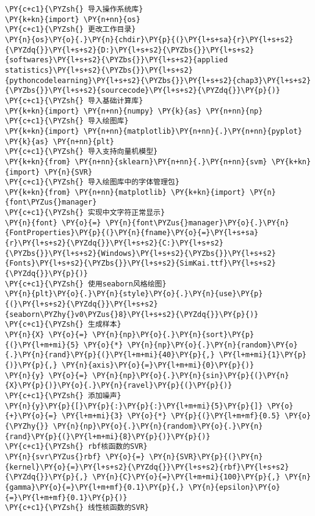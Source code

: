 \begin{Verbatim}[commandchars=\\\{\}]
\PY{c+c1}{\PYZsh{} 导入操作系统库}
\PY{k+kn}{import} \PY{n+nn}{os}
\PY{c+c1}{\PYZsh{} 更改工作目录}
\PY{n}{os}\PY{o}{.}\PY{n}{chdir}\PY{p}{(}\PY{l+s+sa}{r}\PY{l+s+s2}{\PYZdq{}}\PY{l+s+s2}{D:}\PY{l+s+s2}{\PYZbs{}}\PY{l+s+s2}{softwares}\PY{l+s+s2}{\PYZbs{}}\PY{l+s+s2}{applied statistics}\PY{l+s+s2}{\PYZbs{}}\PY{l+s+s2}{pythoncodelearning}\PY{l+s+s2}{\PYZbs{}}\PY{l+s+s2}{chap3}\PY{l+s+s2}{\PYZbs{}}\PY{l+s+s2}{sourcecode}\PY{l+s+s2}{\PYZdq{}}\PY{p}{)}
\PY{c+c1}{\PYZsh{} 导入基础计算库}
\PY{k+kn}{import} \PY{n+nn}{numpy} \PY{k}{as} \PY{n+nn}{np}
\PY{c+c1}{\PYZsh{} 导入绘图库}
\PY{k+kn}{import} \PY{n+nn}{matplotlib}\PY{n+nn}{.}\PY{n+nn}{pyplot} \PY{k}{as} \PY{n+nn}{plt}
\PY{c+c1}{\PYZsh{} 导入支持向量机模型}
\PY{k+kn}{from} \PY{n+nn}{sklearn}\PY{n+nn}{.}\PY{n+nn}{svm} \PY{k+kn}{import} \PY{n}{SVR}
\PY{c+c1}{\PYZsh{} 导入绘图库中的字体管理包}
\PY{k+kn}{from} \PY{n+nn}{matplotlib} \PY{k+kn}{import} \PY{n}{font\PYZus{}manager}
\PY{c+c1}{\PYZsh{} 实现中文字符正常显示}
\PY{n}{font} \PY{o}{=} \PY{n}{font\PYZus{}manager}\PY{o}{.}\PY{n}{FontProperties}\PY{p}{(}\PY{n}{fname}\PY{o}{=}\PY{l+s+sa}{r}\PY{l+s+s2}{\PYZdq{}}\PY{l+s+s2}{C:}\PY{l+s+s2}{\PYZbs{}}\PY{l+s+s2}{Windows}\PY{l+s+s2}{\PYZbs{}}\PY{l+s+s2}{Fonts}\PY{l+s+s2}{\PYZbs{}}\PY{l+s+s2}{SimKai.ttf}\PY{l+s+s2}{\PYZdq{}}\PY{p}{)}
\PY{c+c1}{\PYZsh{} 使用seaborn风格绘图}
\PY{n}{plt}\PY{o}{.}\PY{n}{style}\PY{o}{.}\PY{n}{use}\PY{p}{(}\PY{l+s+s2}{\PYZdq{}}\PY{l+s+s2}{seaborn\PYZhy{}v0\PYZus{}8}\PY{l+s+s2}{\PYZdq{}}\PY{p}{)}
\PY{c+c1}{\PYZsh{} 生成样本}
\PY{n}{X} \PY{o}{=} \PY{n}{np}\PY{o}{.}\PY{n}{sort}\PY{p}{(}\PY{l+m+mi}{5} \PY{o}{*} \PY{n}{np}\PY{o}{.}\PY{n}{random}\PY{o}{.}\PY{n}{rand}\PY{p}{(}\PY{l+m+mi}{40}\PY{p}{,} \PY{l+m+mi}{1}\PY{p}{)}\PY{p}{,} \PY{n}{axis}\PY{o}{=}\PY{l+m+mi}{0}\PY{p}{)}
\PY{n}{y} \PY{o}{=} \PY{n}{np}\PY{o}{.}\PY{n}{sin}\PY{p}{(}\PY{n}{X}\PY{p}{)}\PY{o}{.}\PY{n}{ravel}\PY{p}{(}\PY{p}{)}
\PY{c+c1}{\PYZsh{} 添加噪声}
\PY{n}{y}\PY{p}{[}\PY{p}{:}\PY{p}{:}\PY{l+m+mi}{5}\PY{p}{]} \PY{o}{+}\PY{o}{=} \PY{l+m+mi}{3} \PY{o}{*} \PY{p}{(}\PY{l+m+mf}{0.5} \PY{o}{\PYZhy{}} \PY{n}{np}\PY{o}{.}\PY{n}{random}\PY{o}{.}\PY{n}{rand}\PY{p}{(}\PY{l+m+mi}{8}\PY{p}{)}\PY{p}{)}
\PY{c+c1}{\PYZsh{} rbf核函数的SVR}
\PY{n}{svr\PYZus{}rbf} \PY{o}{=} \PY{n}{SVR}\PY{p}{(}\PY{n}{kernel}\PY{o}{=}\PY{l+s+s2}{\PYZdq{}}\PY{l+s+s2}{rbf}\PY{l+s+s2}{\PYZdq{}}\PY{p}{,} \PY{n}{C}\PY{o}{=}\PY{l+m+mi}{100}\PY{p}{,} \PY{n}{gamma}\PY{o}{=}\PY{l+m+mf}{0.1}\PY{p}{,} \PY{n}{epsilon}\PY{o}{=}\PY{l+m+mf}{0.1}\PY{p}{)}
\PY{c+c1}{\PYZsh{} 线性核函数的SVR}

\end{Verbatim}

